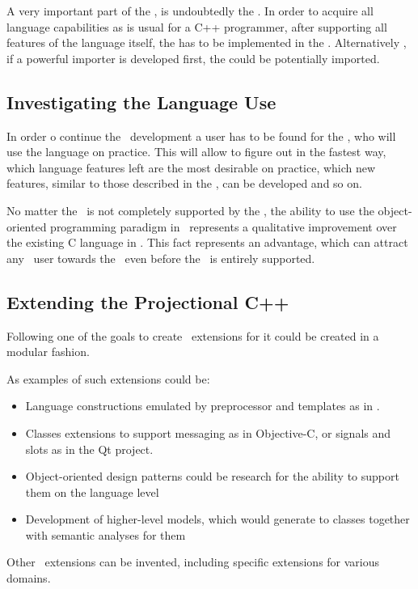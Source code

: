 A very important part of the \cpppl, is undoubtedly  the . In order to acquire
all language capabilities as is usual for a C++ programmer, after supporting all features
of the language itself, the  has to be implemented in the \pcpp. Alternatively , if a powerful
importer is developed first, the  could be potentially imported. 

\subsection{Investigating the Language Use}

In order o continue the \pcpp\ development a user has to be found for the \pcpp, who
will use the language on practice. This will allow to figure out in the fastest way,
which language features left are the most desirable on practice, which new features,
similar to those described in the , can be developed and so on.

No matter the \cpppl\ is not completely supported by the \pcpp, the ability to use the
object-oriented programming paradigm in \mbdr\ represents a qualitative improvement over
the existing C language in \mbdr. This fact represents an advantage, which can
attract any \mbdr\ user towards the \pcpp\ even before the \cpppl\ is entirely supported.

\subsection{Extending the Projectional C++}

Following one of the goals to create \pcpp\ extensions for it could be created in a 
modular fashion.

As examples of such extensions could be:
\begin{itemize}
 \item Language constructions emulated by preprocessor and templates as in \cite{alexandrescumeta}.
 \item Classes extensions to support messaging as in Objective-C, or signals and slots as in the Qt project.
 \item Object-oriented design patterns could be research for the ability to support them on the 
 language level
 \item Development of higher-level models, which would generate to classes together with semantic analyses for them
\end{itemize}

Other \pcpp\ extensions can be invented, including specific extensions for various domains.



